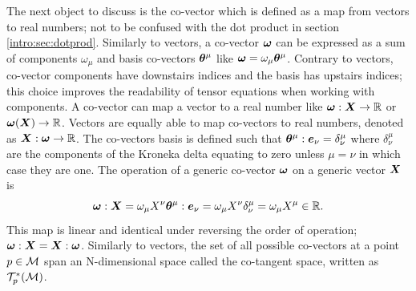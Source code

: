 The next object to discuss is the co-vector which is defined as a map from vectors to real numbers; not to be confused with the dot product in section \ref{intro:sec:dotprod}. Similarly to vectors, a co-vector $\boldsymbol{\omega}$ can be expressed as a sum of components $\omega_\mu$ and basis co-vectors $\boldsymbol{\theta}^\mu$ like $\boldsymbol{\omega} = \omega_\mu \boldsymbol{\theta}^\mu$. Contrary to vectors, co-vector components have downstairs indices and the basis has upstairs indices; this choice improves the readability of tensor equations when working with components. A co-vector can map a vector to a real number like $\boldsymbol{\omega}:\boldsymbol{X} \rightarrow \mathbb{R}$ or $\boldsymbol{\omega}(\boldsymbol{X}) \rightarrow \mathbb{R}$. Vectors are equally able to map co-vectors to real numbers, denoted as $\boldsymbol{X}:\boldsymbol{\omega}\rightarrow\mathbb{R}$. {\color{orchid}The co-vectors basis is} defined such that $\boldsymbol{\theta}^\mu : \boldsymbol{e}_\nu = \delta^\mu_\nu$ where $\delta^\mu_\nu$ are the components of the Kroneka delta equating to zero unless $\mu=\nu$ in which case they are one. The operation of a generic co-vector $\boldsymbol{\omega}$ on a generic vector $\boldsymbol{X}$ is
\begin{equation}
\boldsymbol{\omega}: \boldsymbol{X} = \omega_\mu X^\nu \boldsymbol{\theta}^\mu:\boldsymbol{e}_\nu = \omega_\mu X^\nu \delta^\mu_\nu = \omega_\mu X^\mu \in \mathbb{R}.
\end{equation}
This map is linear and identical under reversing the order of operation; $\boldsymbol{\omega} : \boldsymbol{X} = \boldsymbol{X} : \boldsymbol{\omega}$. Similarly to vectors, the set of all possible co-vectors at a point $p\in\mathcal{M}$ span an N-dimensional space called the co-tangent space, written as $\mathcal{T}^*_p(\mathcal{M})$.

